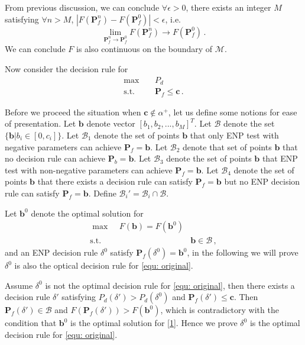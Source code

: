 \documentclass[12pt,journal,a4paper,twoside,onecolumn]{IEEEtran}
\begin{document}
\begin{spacing}{2.5}
From previous discussion, we can conclude $\forall \epsilon > 0 $, there exists an integer $M$ satisfying $\forall n > M$, $|F(\mathbf{P}_f^n) - F(\mathbf{P}_f^0)| < \epsilon$, i.e. 
\[
\lim_{\mathbf{P}_f^n \rightarrow \mathbf{P}_f^0} F(\mathbf{P}_f^n) \rightarrow F(\mathbf{P}_f^0)\,.
\]
We can conclude $F$ is also continuous on the boundary of $\mathcal{M}$. 

Now consider the decision rule for 
\begin{equation}
\begin{split}
\label{equ: original}
\max\;\;\;\;&P_d\\
\text{s.t.}\;\;\;\;&\mathbf{P}_f \leq \mathbf{c}\,.
\end{split}
\end{equation}

Before we proceed the situation when $\mathbf{c} \notin \alpha^+$, let us define some notions for ease of presentation. Let $\mathbf{b}$ denote vector $[b_1, b_2, ..., b_M]^T$.  
 Let $\mathcal{B}$ denote the set $\{ \mathbf{b} |  b_i \in [0, c_i] \}$. Let $\mathcal{B}_1$ denote the set of points $\mathbf{b}$ that only ENP test with negative parameters can achieve $\mathbf{P}_f = \mathbf{b}$. Let $\mathcal{B}_2$ denote that set of points $\mathbf{b}$ that no decision rule can achieve $\mathbf{P}_{b} = \mathbf{b}$. Let $\mathcal{B}_3$ denote the set of points $\mathbf{b}$ that ENP test with non-negative parameters can achieve $\mathbf{P}_f = \mathbf{b}$. Let $\mathcal{B}_4$ denote the set of points $\mathbf{b}$ that there exists a decision rule can satisfy $\mathbf{P}_f = \mathbf{b}$ but no ENP decision rule can satisfy $\mathbf{P}_f = \mathbf{b}$.
 Define $\mathcal{B}_i' = \mathcal{B}_i \cap \mathcal{B}$. 

Let $\mathbf{b}^0$ denote the optimal solution for 
\begin{equation}
\begin{split}
\label{1}
\max\;\;\;\;F(\mathbf{b}) = F(\mathbf{b}^0)\\
\text{s.t.}\;\;\;\;&\mathbf{b} \in \mathcal{B} \,,
\end{split}
\end{equation}
and an ENP decision rule $\delta^0$ satisfy $\mathbf{P}_f(\delta^0) = \mathbf{b}^0$, in the following we will prove $\delta^0$ is also the optical decision rule for \eqref{equ: original}.

Assume $\delta^0$ is not the optimal decision rule for \eqref{equ: original}, then there exists a decision rule $\delta'$ satisfying $P_d(\delta') > P_d(\delta^0)$ and $\mathbf{P}_f(\delta') \leq \mathbf{c}$. Then $\mathbf{P}_f(\delta') \in \mathcal{B}$ and $F(\mathbf{P}_f(\delta')) > F(\mathbf{b}^0)$, which is contradictory with the condition that $\mathbf{b}^0$ is the optimal solution for \eqref{1}. Hence we prove $\delta^0$ is the optimal decision rule for \eqref{equ: original}.


\end{spacing}
\end{document}
